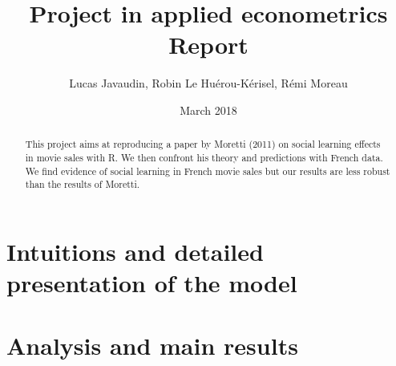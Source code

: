 \documentclass{article}
\title{Project in applied econometrics\\ Report}
\author{Lucas Javaudin, Robin Le Huérou-Kérisel, Rémi Moreau}
\date{March 2018}
\begin{document}
\maketitle

%
%
%
%
%
\begin{abstract}
	This project aims at reproducing a paper by Moretti (2011) on social learning effects in movie sales with R. We then confront his theory and predictions with French data. We find evidence of social learning in French movie sales but our results are less robust than the results of Moretti.
\end{abstract}
\tableofcontents
\pagebreak
\section{Intuitions and detailed presentation of the model}


\pagebreak
\section{Analysis and main results}



\pagebreak

\pagebreak
\end{document}
